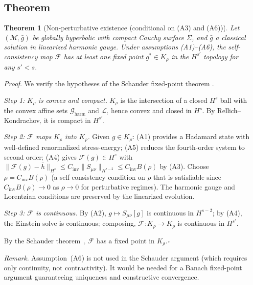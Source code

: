 \documentclass[12pt,a4paper]{article}
\newtheorem{theorem}{Theorem}
\begin{document}
\subsection{Theorem}

\begin{theorem}[Non-perturbative existence (conditional on (A3) and (A6))]
\label{thm:schauder}
Let $(\mathcal{M},\bar{g})$ be globally hyperbolic with compact Cauchy surface $\Sigma$,
and $\bar{g}$ a classical solution in linearized harmonic gauge. Under assumptions
\emph{(A1)--(A6)}, the self-consistency map $\mathcal{F}$ has at least one fixed point
$g^* \in K_\rho$ in the $H^{s'}$ topology for any $s' < s$.
\end{theorem}

\noindent\emph{Proof.} We verify the hypotheses of the Schauder fixed-point theorem
\cite{schauder}.

\smallskip\noindent\textit{Step 1: $K_\rho$ is convex and compact.} $K_\rho$ is the
intersection of a closed $H^s$ ball with the convex affine sets $\mathcal{G}_{\text{harm}}$
and $\mathcal{L}$, hence convex and closed in $H^s$. By Rellich--Kondrachov, it is compact
in $H^{s'}$.

\smallskip\noindent\textit{Step 2: $\mathcal{F}$ maps $K_\rho$ into $K_\rho$.} Given
$g\in K_\rho$: (A1) provides a Hadamard state with well-defined renormalized
stress-energy; (A5) reduces the fourth-order system to second order; (A4) gives
$\mathcal{F}(g) \in H^s$ with $\|\mathcal{F}(g)-\bar{h}\|_{H^s} \leq
C_{\text{inv}}\|S_{\mu\nu}\|_{H^{s-2}} \leq C_{\text{inv}}B(\rho)$ by (A3). Choose
$\rho = C_{\text{inv}}B(\rho)$ (a self-consistency condition on $\rho$ that is satisfiable
since $C_{\text{inv}}B(\rho)\to 0$ as $\rho\to 0$ for perturbative regimes). The harmonic
gauge and Lorentzian conditions are preserved by the linearized evolution.

\smallskip\noindent\textit{Step 3: $\mathcal{F}$ is continuous.} By (A2), $g\mapsto
S_{\mu\nu}[g]$ is continuous in $H^{s-2}$; by (A4), the Einstein solve is continuous;
composing, $\mathcal{F}: K_\rho\to K_\rho$ is continuous in $H^{s'}$.

\smallskip\noindent By the Schauder theorem~\cite{schauder}, $\mathcal{F}$ has a fixed
point in $K_\rho$.\hfill$\square$

\noindent\emph{Remark.} Assumption~(A6) is not used in the Schauder argument (which
requires only continuity, not contractivity). It would be needed for a Banach fixed-point
argument guaranteeing uniqueness and constructive convergence.
\end{document}
